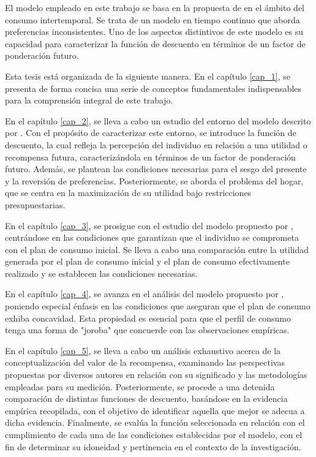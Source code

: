 El modelo empleado en este trabajo se basa en la propuesta de \parencite{feigenbaum2021deviation} en el ámbito del consumo intertemporal. Se trata de un modelo en tiempo continuo que aborda preferencias inconsistentes. Uno de los aspectos distintivos de este modelo es su capacidad para caracterizar la función de descuento en términos de un factor de ponderación futuro. 

Esta tesis está organizada de la siguiente manera. En el capítulo \ref{cap_1}, se presenta de forma concisa una serie de conceptos fundamentales indispensables para la comprensión integral de este trabajo.

En el capítulo \ref{cap_2}, se lleva a cabo un estudio del entorno del modelo descrito por \parencite{feigenbaum2021deviation}. Con el propósito de caracterizar este entorno, se introduce la función de descuento, la cual refleja la percepción del individuo en relación a una utilidad o recompensa futura, caracterizándola en términos de un factor de ponderación futuro. Además, se plantean las condiciones necesarias para el sesgo del presente y la reversión de preferencias. Posteriormente, se aborda el problema del hogar, que se centra en la maximización de su utilidad bajo restricciones presupuestarias.

En el capítulo \ref{cap_3}, se prosigue con el estudio del modelo propuesto por \parencite{feigenbaum2021deviation}, centrándose en las condiciones que garantizan que el individuo se comprometa con el plan de consumo inicial. Se lleva a cabo una comparación entre la utilidad generada por el plan de consumo inicial y el plan de consumo efectivamente realizado y se establecen las condiciones necesarias.

En el capítulo \ref{cap_4}, se avanza en el análisis del modelo propuesto por \parencite{feigenbaum2021deviation}, poniendo especial énfasis en las condiciones que aseguran que el plan de consumo exhiba concavidad. Esta propiedad es esencial para que el perfil de consumo tenga una forma de "joroba" que concuerde con las observaciones empíricas.

En el capítulo \ref{cap_5}, se lleva a cabo un análisis exhaustivo acerca de la conceptualización del valor de la recompensa, examinando las perspectivas propuestas por diversos autores en relación con su significado y las metodologías empleadas para su medición. Posteriormente, se procede a una detenida comparación de distintas funciones de descuento, basándose en la evidencia empírica recopilada, con el objetivo de identificar aquella que mejor se adecua a dicha evidencia. Finalmente, se evalúa la función seleccionada en relación con el cumplimiento de cada una de las condiciones establecidas por el modelo, con el fin de determinar su idoneidad y pertinencia en el contexto de la investigación.
 








